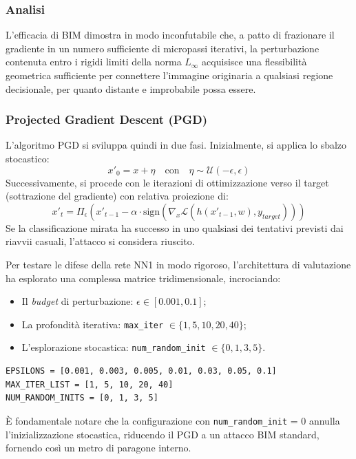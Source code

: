 \documentclass[a4paper, 12pt]{article}
\begin{document}
\subsubsection*{Analisi}
L'efficacia di BIM dimostra in modo inconfutabile che, 
a patto di frazionare il gradiente in un numero sufficiente di micropassi iterativi, la perturbazione contenuta
entro i rigidi limiti della norma $L_\infty$ acquisisce una flessibilità geometrica sufficiente per connettere l'immagine
originaria a qualsiasi regione decisionale, per quanto distante e improbabile possa essere.

\vspace{10pt}

\subsubsection{Projected Gradient Descent (PGD)}
L'algoritmo PGD si sviluppa quindi in due fasi. Inizialmente, si applica lo sbalzo stocastico:
$$ x'_0 = x + \eta \quad \text{con} \quad \eta \sim \mathcal{U}(-\epsilon, \epsilon) $$
Successivamente, si procede con le iterazioni di ottimizzazione verso il target (sottrazione del gradiente) con relativa proiezione di:
$$ x'_t = \Pi_\epsilon \left( x'_{t-1} - \alpha \cdot \text{sign}(\nabla_x \mathcal{L}(h(x'_{t-1}, w), y_{target})) \right) $$
Se la classificazione mirata ha successo in uno qualsiasi dei tentativi previsti dai riavvii casuali, l'attacco si considera riuscito.

Per testare le difese della rete NN1 in modo rigoroso, l'architettura di valutazione ha esplorato una complessa matrice tridimensionale, incrociando:
\begin{itemize}
    \item Il \textit{budget} di perturbazione: $\epsilon \in [0.001, 0.1]$;
    \item La profondità iterativa: \texttt{max\_iter} $\in \{1, 5, 10, 20, 40\}$;
    \item L'esplorazione stocastica: \texttt{num\_random\_init} $\in \{0, 1, 3, 5\}$.
\end{itemize}


\begin{verbatim}
EPSILONS = [0.001, 0.003, 0.005, 0.01, 0.03, 0.05, 0.1]
MAX_ITER_LIST = [1, 5, 10, 20, 40]
NUM_RANDOM_INITS = [0, 1, 3, 5]

\end{verbatim}

È fondamentale notare che la configurazione con \texttt{num\_random\_init} = 0 annulla l'inizializzazione stocastica, riducendo il PGD a un attacco BIM standard, fornendo così un metro di paragone interno.
\end{document}
